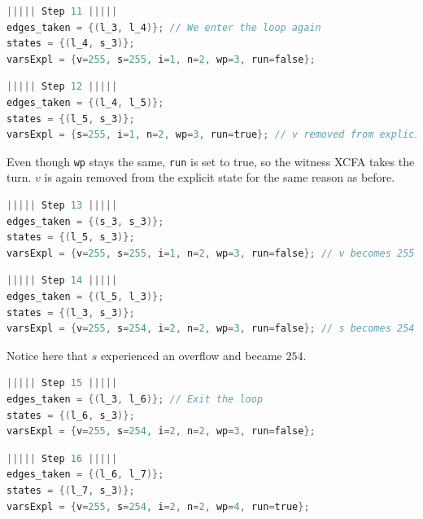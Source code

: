 \begin{lstlisting}[style=C, language=C, basicstyle=\ttfamily\footnotesize, columns=flexible,
    breaklines=true, breakatwhitespace=true, tabsize=2, showstringspaces=false]
||||| Step 11 |||||
edges_taken = {(l_3, l_4)}; // We enter the loop again
states = {(l_4, s_3)};
varsExpl = {v=255, s=255, i=1, n=2, wp=3, run=false};
\end{lstlisting}
\begin{lstlisting}[style=C, language=C, basicstyle=\ttfamily\footnotesize, columns=flexible,
    breaklines=true, breakatwhitespace=true, tabsize=2, showstringspaces=false]
||||| Step 12 |||||
edges_taken = {(l_4, l_5)};
states = {(l_5, s_3)};
varsExpl = {s=255, i=1, n=2, wp=3, run=true}; // v removed from explicit state
\end{lstlisting}
Even though \texttt{wp} stays the same, \texttt{run} is set to true, so the witness XCFA takes the turn.
$v$ is again removed from the explicit state for the same reason as before.
\begin{lstlisting}[style=C, language=C, basicstyle=\ttfamily\footnotesize, columns=flexible,
    breaklines=true, breakatwhitespace=true, tabsize=2, showstringspaces=false]
||||| Step 13 |||||
edges_taken = {(s_3, s_3)};
states = {(l_5, s_3)};
varsExpl = {v=255, s=255, i=1, n=2, wp=3, run=false}; // v becomes 255
\end{lstlisting}
\begin{lstlisting}[style=C, language=C, basicstyle=\ttfamily\footnotesize, columns=flexible,
    breaklines=true, breakatwhitespace=true, tabsize=2, showstringspaces=false]
||||| Step 14 |||||
edges_taken = {(l_5, l_3)};
states = {(l_3, s_3)};
varsExpl = {v=255, s=254, i=2, n=2, wp=3, run=false}; // s becomes 254
\end{lstlisting}
Notice here that $s$ experienced an overflow and became $254$.
\begin{lstlisting}[style=C, language=C, basicstyle=\ttfamily\footnotesize, columns=flexible,
    breaklines=true, breakatwhitespace=true, tabsize=2, showstringspaces=false]
||||| Step 15 |||||
edges_taken = {(l_3, l_6)}; // Exit the loop
states = {(l_6, s_3)};
varsExpl = {v=255, s=254, i=2, n=2, wp=3, run=false};
\end{lstlisting}
\begin{lstlisting}[style=C, language=C, basicstyle=\ttfamily\footnotesize, columns=flexible,
    breaklines=true, breakatwhitespace=true, tabsize=2, showstringspaces=false]
||||| Step 16 |||||
edges_taken = {(l_6, l_7)};
states = {(l_7, s_3)};
varsExpl = {v=255, s=254, i=2, n=2, wp=4, run=true};
\end{lstlisting}

